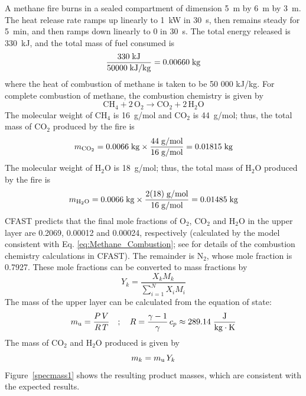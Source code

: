 A methane fire burns in a sealed compartment of dimension 5~m by 6~m by 3~m. The heat release rate ramps up linearly to 1~kW in 30~s, then remains steady for 5~min, and then ramps down linearly to 0 in 30~s. The total energy released is 330~kJ, and the total mass of fuel consumed is
\begin{equation}
  \frac{ 330 \; {\rm kJ} }{ 50000 \; {\rm kJ/kg} } = 0.00660 \; {\rm kg}
\end{equation}
where the heat of combustion of methane is taken to be 50 000 kJ/kg. For complete combustion of methane, the combustion chemistry is given by
\begin{equation}
   \mathrm{CH_4 + 2 \, O_2 \to CO_2 + 2 \, H_2O}
   \label{eq:Methane_Combustion}
\end{equation}
The molecular weight of CH$_4$ is 16~\unit{g/mol} and CO$_2$ is 44~\unit{g/mol}; thus, the total mass of CO$_2$ produced by the fire is
\begin{equation}
   m_{\rm CO_2} = 0.0066 \; {\rm kg} \times  \frac{ 44 \; {\rm g/mol} }{ 16 \; {\rm g/mol} } = 0.01815 \; {\rm kg}
\end{equation}
The molecular weight of H$_2$O is 18~\unit{g/mol}; thus, the total mass of H$_2$O produced by the fire is
\begin{equation}
   m_{\rm H_2O} = 0.0066 \; {\rm kg} \times  \frac{ 2(18) \; {\rm g/mol} }{ 16 \; {\rm g/mol} } = 0.01485 \; {\rm kg}
\end{equation}
CFAST predicts that the final mole fractions of O$_2$, CO$_2$ and H$_2$O in the upper layer are 0.2069, 0.00012 and 0.00024, respectively (calculated by the model consistent with Eq. \ref{eq:Methane_Combustion}; see \cite{CFAST_Tech_Guide_8} for details of the combustion chemistry calculations in CFAST). The remainder is N$_2$, whose mole fraction is 0.7927. These mole fractions can be converted to mass fractions by
\begin{equation}
Y_k = \frac{X_{k} M_{k}}{\sum_{i=1}^N X_{i}M_{i}}
\end{equation}
The mass of the upper layer can be calculated from the equation of state:
\begin{equation}
m_{\rm u} = \frac{P \, V}{R \, T} \quad ; \quad R = \frac{\gamma-1}{\gamma} \, c_p \approx 289.14 \; {\rm  \frac{J}{kg \cdot K}}
\end{equation}
The mass of CO$_2$ and H$_2$O produced is given by
\begin{equation}
m_{k} = m_{\rm u} \, Y_{k}
\end{equation}
Figure~\ref{specmass1} shows the resulting product masses, which are consistent with the expected results.


